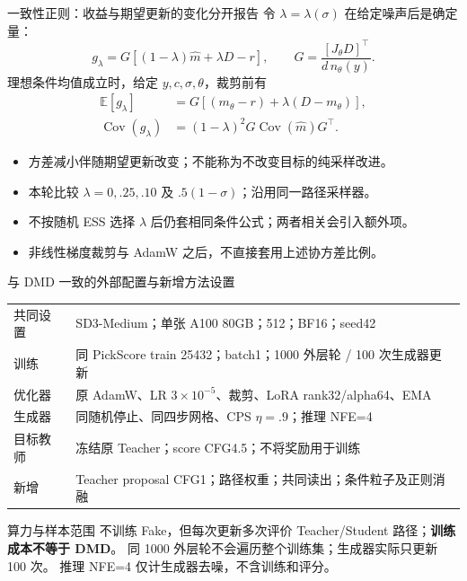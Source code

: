\documentclass[10pt,aspectratio=169]{beamer}
\newcommand{\E}{\mathbb E}
\newcommand{\Cov}{\operatorname{Cov}}
\begin{document}
\begin{frame}{一致性正则：收益与期望更新的变化分开报告}
\small
令 $\lambda=\lambda(\sigma)$ 在给定噪声后是确定量：
\begin{equation}
g_\lambda=G\left[(1-\lambda)\widehat m+\lambda D-r\right],\qquad
G=\frac{[J_\theta D]^\top}{d\,n_\theta(y)}.
\end{equation}
理想条件均值成立时，给定 $y,c,\sigma,\theta$，裁剪前有
\begin{align}
\E[g_\lambda]&=G[(m_\theta-r)+\lambda(D-m_\theta)],\\
\Cov(g_\lambda)&=(1-\lambda)^2G\Cov(\widehat m)G^\top.
\end{align}
\begin{itemize}\itemsep4pt
\item 方差减小伴随期望更新改变；不能称为不改变目标的纯采样改进。
\item 本轮比较 $\lambda=0,.25,.10$ 及 $.5(1-\sigma)$；沿用同一路径采样器。
\item 不按随机 ESS 选择 $\lambda$ 后仍套相同条件公式；两者相关会引入额外项。
\item 非线性梯度裁剪与 AdamW 之后，不直接套用上述协方差比例。
\end{itemize}
\end{frame}

\begin{frame}{与 DMD 一致的外部配置与新增方法设置}
\small
\begin{tabularx}{\textwidth}{lX}
\toprule
共同设置 & SD3-Medium；单张 A100 80GB；512；BF16；seed42\\
训练 & 同 PickScore train 25432；batch1；1000 外层轮 / 100 次生成器更新\\
优化器 & 原 AdamW、LR $3\times10^{-5}$、裁剪、LoRA rank32/alpha64、EMA\\
生成器 & 同随机停止、同四步网格、CPS $\eta=.9$；推理 NFE=4\\
目标教师 & 冻结原 Teacher；score CFG4.5；不将奖励用于训练\\
新增 & Teacher proposal CFG1；路径权重；共同读出；条件粒子及正则消融\\
\bottomrule
\end{tabularx}
\begin{alertblock}{算力与样本范围}
不训练 Fake，但每次更新多次评价 Teacher/Student 路径；\textbf{训练成本不等于 DMD}。
同 1000 外层轮不会遍历整个训练集；生成器实际只更新 100 次。
推理 NFE=4 仅计生成器去噪，不含训练和评分。
\end{alertblock}
\end{frame}
\end{document}
